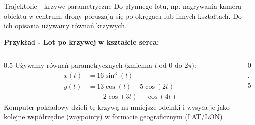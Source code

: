 \begin{frame}{Trajektorie - krzywe parametryczne}
    Do płynnego lotu, np. nagrywania kamerą obiektu w centrum, drony poruszają się po okręgach lub innych kształtach. Do ich opisania używamy równań krzywych.
    
    \vspace{0.3cm}
    \textbf{Przykład - Lot po krzywej w kształcie serca:}
    \begin{columns}
        \begin{column}{0.5\textwidth}
            \small
            Używamy równań parametrycznych (zmienna $t$ od $0$ do $2\pi$):
            \begin{align*}
                x(t) &= 16 \sin^3(t) \\
                y(t) &= 13 \cos(t) - 5 \cos(2t) \\
                     &\quad - 2 \cos(3t) - \cos(4t)
            \end{align*}
            Komputer pokładowy dzieli tę krzywą na mniejsze odcinki i wysyła je jako kolejne współrzędne (waypointy) w formacie geograficznym (LAT/LON).
        \end{column}
        \begin{column}{0.5\textwidth}
            \begin{center}
            \end{center}
        \end{column}
    \end{columns}
\end{frame}
